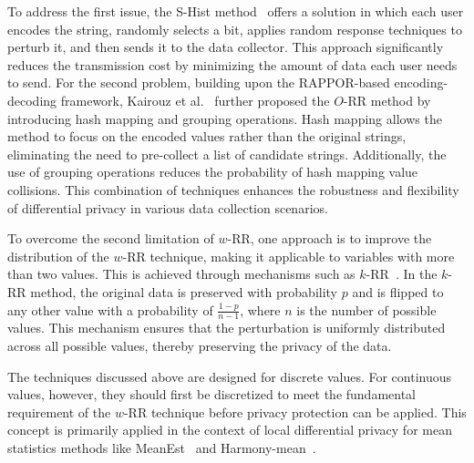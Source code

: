 To address the first issue, the S-Hist method~\cite{bassily2015local} offers a solution in which each user encodes the string, randomly selects a bit, applies random response techniques to perturb it, and then sends it to the data collector. This approach significantly reduces the transmission cost by minimizing the amount of data each user needs to send. 
For the second problem, building upon the RAPPOR-based encoding-decoding framework, Kairouz et al.~\cite{kairouz2016discrete} further proposed the $O$-RR method by introducing hash mapping and grouping operations. Hash mapping allows the method to focus on the encoded values rather than the original strings, eliminating the need to pre-collect a list of candidate strings. Additionally, the use of grouping operations reduces the probability of hash mapping value collisions. This combination of techniques enhances the robustness and flexibility of differential privacy in various data collection scenarios.%

To overcome the second limitation of $w$-RR, one approach is to improve the distribution of the $w$-RR technique, making it applicable to variables with more than two values. This is achieved through mechanisms such as $k$-RR~\cite{kairouz2014extremal}. In the $k$-RR method, the original data is preserved with probability $p$ and is flipped to any other value with a probability of $\frac{1-p}{n-1}$,  where $n$ is the number of possible values. This mechanism ensures that the perturbation is uniformly distributed across all possible values, thereby preserving the privacy of the data. 

The techniques discussed above are designed for discrete values. For continuous values, however, they should first be discretized to meet the fundamental requirement of the $w$-RR technique before privacy protection can be applied. This concept is primarily applied in the context of local differential privacy for mean statistics methods like MeanEst~\cite{duchi2013local,duchi2014privacy} and Harmony-mean~\cite{nguyen2016collecting}.

